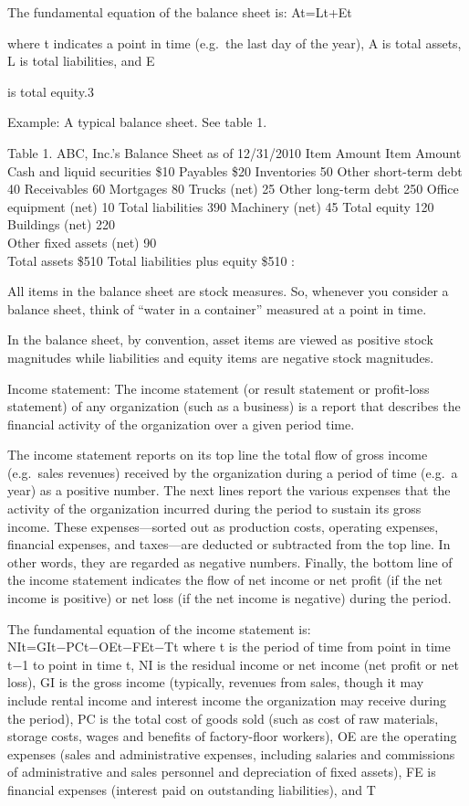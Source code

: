 \documentclass[
]{article}
\begin{document}
The fundamental equation of the balance sheet is: At=Lt+Et

where t indicates a point in time (e.g.~the last day of the year), A is
total assets, L is total liabilities, and E

is total equity.3

Example: A typical balance sheet. See table 1.

Table 1. ABC, Inc.'s Balance Sheet as of 12/31/2010 Item Amount Item
Amount Cash and liquid securities \$10 Payables \$20 Inventories 50
Other short-term debt 40 Receivables 60 Mortgages 80 Trucks (net) 25
Other long-term debt 250 Office equipment (net) 10 Total liabilities 390
Machinery (net) 45 Total equity 120 Buildings (net) 220\\
Other fixed assets (net) 90\\
Total assets \$510 Total liabilities plus equity \$510 :

All items in the balance sheet are stock measures. So, whenever you
consider a balance sheet, think of ``water in a container'' measured at
a point in time.

In the balance sheet, by convention, asset items are viewed as positive
stock magnitudes while liabilities and equity items are negative stock
magnitudes.

Income statement: The income statement (or result statement or
profit-loss statement) of any organization (such as a business) is a
report that describes the financial activity of the organization over a
given period time.

The income statement reports on its top line the total flow of gross
income (e.g.~sales revenues) received by the organization during a
period of time (e.g.~a year) as a positive number. The next lines report
the various expenses that the activity of the organization incurred
during the period to sustain its gross income. These expenses---sorted
out as production costs, operating expenses, financial expenses, and
taxes---are deducted or subtracted from the top line. In other words,
they are regarded as negative numbers. Finally, the bottom line of the
income statement indicates the flow of net income or net profit (if the
net income is positive) or net loss (if the net income is negative)
during the period.

The fundamental equation of the income statement is:
NIt=GIt−PCt−OEt−FEt−Tt where t is the period of time from point in time
t−1 to point in time t, NI is the residual income or net income (net
profit or net loss), GI is the gross income (typically, revenues from
sales, though it may include rental income and interest income the
organization may receive during the period), PC is the total cost of
goods sold (such as cost of raw materials, storage costs, wages and
benefits of factory-floor workers), OE are the operating expenses (sales
and administrative expenses, including salaries and commissions of
administrative and sales personnel and depreciation of fixed assets), FE
is financial expenses (interest paid on outstanding liabilities), and T
\end{document}
